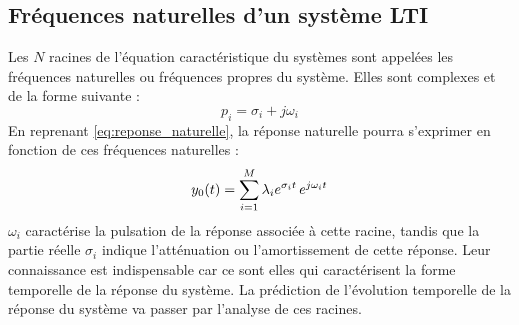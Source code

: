 \begin{remark}{}
	\subsection{Fréquences naturelles d'un système LTI}
	Les $N$ racines de l'équation caractéristique du systèmes sont
        appelées les fréquences naturelles ou fréquences propres du
        système. Elles sont complexes et de la forme suivante :
	\begin{equation}\label{freq_propre}
          p_{i} = \sigma_{i} + j\omega_{i} 
	\end{equation}	
	En reprenant \ref{eq:reponse_naturelle}, la réponse naturelle
        pourra s'exprimer en fonction de ces fréquences naturelles :		
	\begin{equation}\label{eq:reponse_naturelle_freq}
          y_{0}(t) = \sum_{i=1}^M \lambda_{i}e^{\sigma_{i}t}\,e^{j\omega_{i}t}
	\end{equation}
	$\omega_{i}$ caractérise la pulsation de la réponse associée à
        cette racine, tandis que la partie réelle $\sigma_{i}$ indique
        l'atténuation ou l'amortissement de cette réponse. Leur
        connaissance est indispensable car ce sont elles qui
        caractérisent la forme temporelle de la réponse du système. La
        prédiction de l'évolution temporelle de la réponse du système
        va passer par l'analyse de ces racines.
	

\end{remark}
